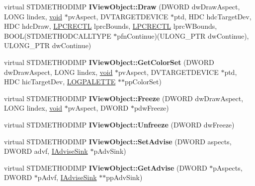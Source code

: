 \begin{DoxyCompactItemize}
\item 
\mbox{\label{class_s_e_a_l_e_d___a4aa234eb3d3af0de8f6faaf64f78a4ba}} 
virtual S\+T\+D\+M\+E\+T\+H\+O\+D\+I\+MP {\bfseries I\+View\+Object\+::\+Draw} (D\+W\+O\+RD dw\+Draw\+Aspect, L\+O\+NG lindex, \hyperlink{interfacevoid}{void} $\ast$pv\+Aspect, D\+V\+T\+A\+R\+G\+E\+T\+D\+E\+V\+I\+CE $\ast$ptd, H\+DC hdc\+Target\+Dev, H\+DC hdc\+Draw, \hyperlink{struct___r_e_c_t_l}{L\+P\+C\+R\+E\+C\+TL} lprc\+Bounds, \hyperlink{struct___r_e_c_t_l}{L\+P\+C\+R\+E\+C\+TL} lprc\+W\+Bounds, B\+O\+OL(S\+T\+D\+M\+E\+T\+H\+O\+D\+C\+A\+L\+L\+T\+Y\+PE $\ast$pfn\+Continue)(U\+L\+O\+N\+G\+\_\+\+P\+TR dw\+Continue), U\+L\+O\+N\+G\+\_\+\+P\+TR dw\+Continue)
\item 
\mbox{\label{class_s_e_a_l_e_d___af2e2ddf9c9e48a92997b94ff906a7464}} 
virtual S\+T\+D\+M\+E\+T\+H\+O\+D\+I\+MP {\bfseries I\+View\+Object\+::\+Get\+Color\+Set} (D\+W\+O\+RD dw\+Draw\+Aspect, L\+O\+NG lindex, \hyperlink{interfacevoid}{void} $\ast$pv\+Aspect, D\+V\+T\+A\+R\+G\+E\+T\+D\+E\+V\+I\+CE $\ast$ptd, H\+DC hic\+Target\+Dev, \hyperlink{structtag_l_o_g_p_a_l_e_t_t_e}{L\+O\+G\+P\+A\+L\+E\+T\+TE} $\ast$$\ast$pp\+Color\+Set)
\item 
\mbox{\label{class_s_e_a_l_e_d___adf55148e3ccec1c165f44595be02ee42}} 
virtual S\+T\+D\+M\+E\+T\+H\+O\+D\+I\+MP {\bfseries I\+View\+Object\+::\+Freeze} (D\+W\+O\+RD dw\+Draw\+Aspect, L\+O\+NG lindex, \hyperlink{interfacevoid}{void} $\ast$pv\+Aspect, D\+W\+O\+RD $\ast$pdw\+Freeze)
\item 
\mbox{\label{class_s_e_a_l_e_d___acec8363bdd90e1427c13f1569f342533}} 
virtual S\+T\+D\+M\+E\+T\+H\+O\+D\+I\+MP {\bfseries I\+View\+Object\+::\+Unfreeze} (D\+W\+O\+RD dw\+Freeze)
\item 
\mbox{\label{class_s_e_a_l_e_d___ab6499dcfdf09cbeea753be64461f8a75}} 
virtual S\+T\+D\+M\+E\+T\+H\+O\+D\+I\+MP {\bfseries I\+View\+Object\+::\+Set\+Advise} (D\+W\+O\+RD aspects, D\+W\+O\+RD advf, \hyperlink{interface_i_advise_sink}{I\+Advise\+Sink} $\ast$p\+Adv\+Sink)
\item 
\mbox{\label{class_s_e_a_l_e_d___a2cbb8791307963f72a3aefbd78b6ab96}} 
virtual S\+T\+D\+M\+E\+T\+H\+O\+D\+I\+MP {\bfseries I\+View\+Object\+::\+Get\+Advise} (D\+W\+O\+RD $\ast$p\+Aspects, D\+W\+O\+RD $\ast$p\+Advf, \hyperlink{interface_i_advise_sink}{I\+Advise\+Sink} $\ast$$\ast$pp\+Adv\+Sink)

\end{DoxyCompactItemize}
